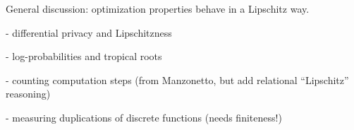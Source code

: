 
General discussion: optimization properties behave in a Lipschitz way.


- differential privacy and Lipschitzness


- log-probabilities and tropical roots 


- counting computation steps (from Manzonetto, but add relational ``Lipschitz'' reasoning)


- measuring duplications of discrete functions (needs finiteness!)



